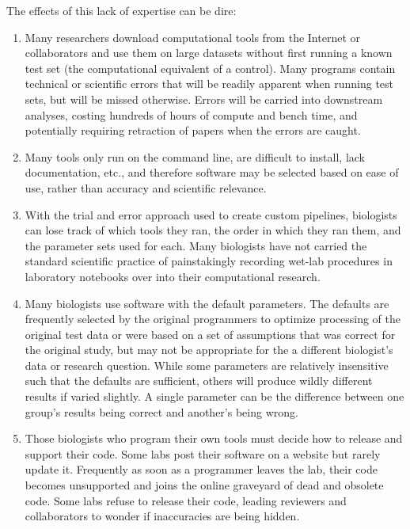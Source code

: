 \documentclass[ChapterTOCs,krantz2]{krantz} %
\begin{document}
The effects of this lack of expertise can be dire:  
\begin{enumerate}
\item Many researchers download computational tools from the Internet 
or collaborators 
and use them on large datasets without first
running a known test set
(the computational equivalent of a control).  Many programs contain
technical or scientific errors that will be readily apparent when running 
test sets, but will be missed otherwise\cite{Kelly2008}. Errors will be
carried into downstream analyses, costing
hundreds of hours of compute and bench time, and 
potentially requiring retraction of papers when the errors are caught\cite{Merali2010}.  

\item Many tools only run on the command line, are difficult to install, lack
documentation, etc., and therefore software may be selected based on ease
of use, rather than accuracy and scientific relevance.

\item With the trial and error
approach used to create custom pipelines, biologists can
lose track of which tools they ran, the order in which they ran them, and the
parameter sets used for each.  Many biologists have not carried 
the standard scientific practice of painstakingly recording
wet-lab procedures in laboratory notebooks
over into their computational research.

\item Many biologists use software with the default parameters.  
The defaults are frequently selected by the original
programmers to optimize processing of the original test data or were based on a
set of assumptions that was correct for the original study, but may not be appropriate
for the a different biologist's data or research question.  While some parameters 
are relatively insensitive such that the defaults are sufficient, others 
will produce wildly different results if varied slightly.  
A single parameter
can be the difference between one group's results being correct and another's
being wrong.  

\item Those biologists who program their own tools must decide how
to release and support their code.
Some labs post their software on a website but rarely update it.  
Frequently as soon as a programmer
leaves the lab, their code becomes unsupported and 
joins the online graveyard of dead and obsolete code.  
Some labs refuse to release their code\cite{Morin2012}, 
leading reviewers and collaborators to wonder if 
inaccuracies are being hidden.  
\end{enumerate}
\end{document}
